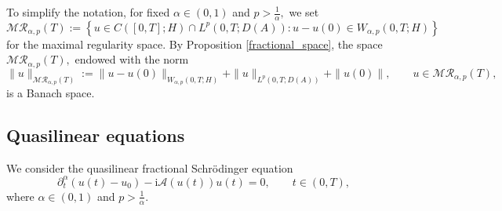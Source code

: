 \documentclass[reqno]{amsart}
\numberwithin{equation}{section}
\begin{document}
To simplify the notation, for fixed $\alpha\in (0,1)$ and $p>\frac{1}{\alpha},$ we set
\begin{equation}\label{MRsp}
    \mathcal{M}\mathcal{R}_{\alpha,p}(T):=\left\{u\in C([0,T];H)\cap L^p(0,T;D(A))\colon  u-u(0)\in W_{\alpha,p}(0,T;H) \right\}
\end{equation}
for the maximal regularity space. By Proposition \ref{fractional_space}, the space $\mathcal{M}\mathcal{R}_{\alpha,p}(T),$ endowed with the norm
\[
\|u\|_{\mathcal{M}\mathcal{R}_{\alpha,p}(T)} := \|u-u(0)\|_{W_{\alpha,p}(0,T;H)} + \|u\|_{L^p(0,T;D(A))}+ \|u(0)\|, \qquad u\in \mathcal{M}\mathcal{R}_{\alpha,p}(T) ,
\]
is a Banach space.

\subsection{Quasilinear equations}
We consider the quasilinear fractional Schr\"odinger equation
\begin{equation}\label{nfseq0}
\partial_t^\alpha (u(t)-u_0) -\mathrm{i} \mathcal{A}(u(t))u(t)=0, \qquad t \in (0,T),
\end{equation}
where $\alpha\in (0,1)$ and $p>\frac{1}{\alpha}$.
\end{document}
